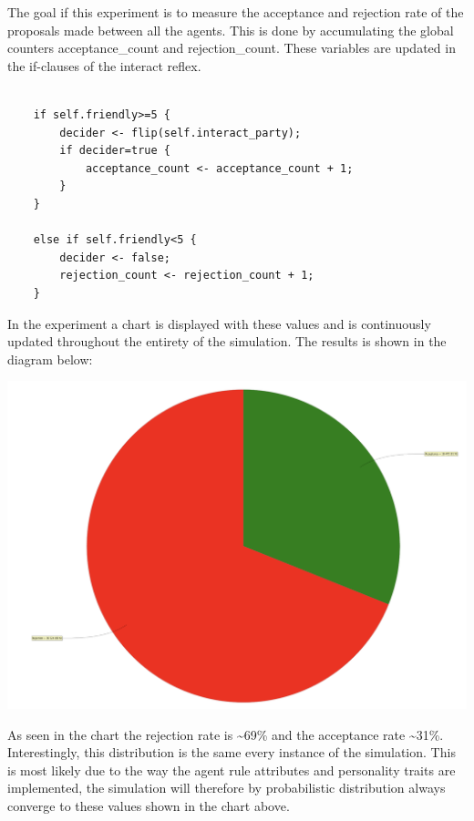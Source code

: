 \documentclass[a4paper,10pt]{article}
\begin{document}
The goal if this experiment is to measure the acceptance and rejection rate of the proposals made between all the agents. This is done by accumulating the global counters acceptance\_count and rejection\_count. These variables are updated in the if-clauses of the interact reflex. 

\begin{verbatim}

    if self.friendly>=5 {
		decider <- flip(self.interact_party);
		if decider=true {
			acceptance_count <- acceptance_count + 1;
        }
    }
    
    else if self.friendly<5 {
	    decider <- false;
	    rejection_count <- rejection_count + 1;
    }
\end{verbatim}

In the experiment a chart is displayed with these values and is continuously updated throughout the entirety of the simulation. The results is shown in the diagram below:

\begin{center}{}
\centering\includegraphics[scale=0.05]{original_exp.png}\par
\end{center}

As seen in the chart the rejection rate is \textasciitilde 69\% and the acceptance rate \textasciitilde 31\%. Interestingly, this distribution is the same every instance of the simulation. This is most likely due to the way the agent rule attributes and personality traits are implemented, the simulation will therefore by probabilistic distribution always converge to these values shown in the chart above. 
\end{document}
